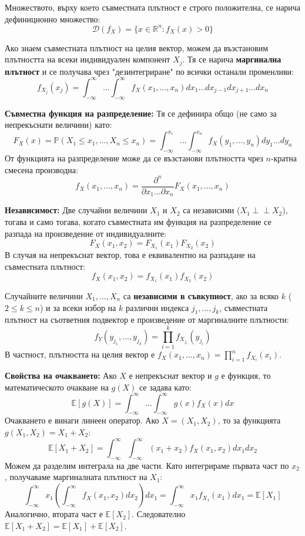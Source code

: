 \documentclass{article}
\begin{document}
Множеството, върху което съвместната плътност е строго положителна, се нарича дефиниционно множество:
\[
\mathcal{D}(f_X) = \{ x \in \mathbb{R}^n : f_X(x) > 0 \}
\]

Ако знаем съвместната плътност на целия вектор, можем да възстановим плътността на всеки индивидуален компонент $X_j$. Тя се нарича \textbf{маргинална плътност} и се получава чрез "дезинтегриране" по всички останали променливи:
\[
f_{X_j}(x_j) = \int_{-\infty}^{\infty} \dots \int_{-\infty}^{\infty} f_X(x_1, \dots, x_n) dx_1 \dots dx_{j-1} dx_{j+1} \dots dx_n
\]

\textbf{Съвместна функция на разпределение:}
Тя се дефинира общо (не само за непрекъснати величини) като:
\[
F_X(x) = \mathbb{P}(X_1 \le x_1, \dots, X_n \le x_n) = \int_{-\infty}^{x_1} \dots \int_{-\infty}^{x_n} f_X(y_1, \dots, y_n) dy_1 \dots dy_n
\]
От функцията на разпределение може да се възстанови плътността чрез $n$-кратна смесена производна:
\[
f_X(x_1, \dots, x_n) = \frac{\partial^n}{\partial x_1 \dots \partial x_n} F_X(x_1, \dots, x_n)
\]

\textbf{Независимост:}
Две случайни величини $X_1$ и $X_2$ са независими ($X_1 \perp \!\!\! \perp X_2$), тогава и само тогава, когато съвместната им функция на разпределение се разпада на произведение от индивидуалните:
\[
F_X(x_1, x_2) = F_{X_1}(x_1) F_{X_2}(x_2)
\]
В случая на непрекъснат вектор, това е еквивалентно на разпадане на съвместната плътност:
\[
f_X(x_1, x_2) = f_{X_1}(x_1) f_{X_2}(x_2)
\]

Случайните величини $X_1, \dots, X_n$ са \textbf{независими в съвкупност}, ако за всяко $k$ ($2 \le k \le n$) и за всеки избор на $k$ различни индекса $j_1, \dots, j_k$, съвместната плътност на съответния подвектор е произведение от маргиналните плътности:
\[
f_Y(y_{j_1}, \dots, y_{j_k}) = \prod_{i=1}^{k} f_{X_{j_i}}(y_{j_i})
\]
В частност, плътността на целия вектор е $f_X(x_1, \dots, x_n) = \prod_{i=1}^n f_{X_i}(x_i)$.

\textbf{Свойства на очакването:}
Ако $X$ е непрекъснат вектор и $g$ е функция, то математическото очакване на $g(X)$ се задава като:
\[
\mathbb{E}[g(X)] = \int_{-\infty}^{\infty} \dots \int_{-\infty}^{\infty} g(x) f_X(x) dx
\]
Очакването е винаги линеен оператор. Ако $X = (X_1, X_2)$, то за функцията $g(X_1, X_2) = X_1 + X_2$:
\[
\mathbb{E}[X_1 + X_2] = \int_{-\infty}^{\infty} \int_{-\infty}^{\infty} (x_1 + x_2) f_X(x_1, x_2) dx_1 dx_2
\]
Можем да разделим интеграла на две части. Като интегрираме първата част по $x_2$, получаваме маргиналната плътност на $X_1$:
\[
\int_{-\infty}^{\infty} x_1 \left( \int_{-\infty}^{\infty} f_X(x_1, x_2) dx_2 \right) dx_1 = \int_{-\infty}^{\infty} x_1 f_{X_1}(x_1) dx_1 = \mathbb{E}[X_1]
\]
Аналогично, втората част е $\mathbb{E}[X_2]$. Следователно $\mathbb{E}[X_1 + X_2] = \mathbb{E}[X_1] + \mathbb{E}[X_2]$. 
\end{document}
